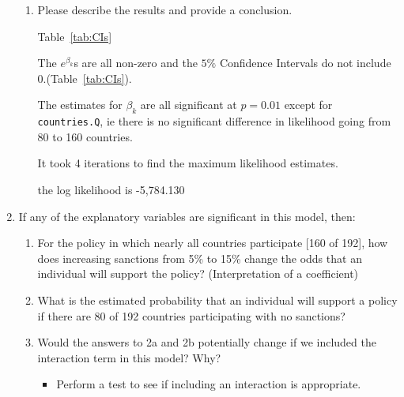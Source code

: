 \documentclass[12pt,letterpaper]{article}
\begin{document}
\begin{enumerate}
\begin{enumerate}
%	    
%	    
			

		\item  Please describe the results and provide a conclusion.

      Table~\ref{tab:CIs}
      
      The $e^{\beta_k}$s are all non-zero and the $5\%$ Confidence Intervals do not include 0.(Table~\ref{tab:CIs}).
      
      The estimates for $\beta_k$ are all significant at $p=0.01$ except for \texttt{countries.Q}, ie there is no significant difference in likelihood going from 80 to 160 countries.
      
	    

		It took 4 iterations to find the maximum likelihood estimates.
		
		the log likelihood is -5,784.130
	\end{enumerate}


	

	\item
	If any of the explanatory variables are significant in this model, then:
	\begin{enumerate}
		\item
		For the policy in which nearly all countries participate [160 of 192], how does increasing sanctions from 5\% to 15\% change the odds that an individual will support the policy? (Interpretation of a coefficient)
		\item
		What is the estimated probability that an individual will support a policy if there are 80 of 192 countries participating with no sanctions? 
		\item
		Would the answers to 2a and 2b potentially change if we included the interaction term in this model? Why? 
		\begin{itemize}
			\item Perform a test to see if including an interaction is appropriate.
			
			  
    	  

		\end{itemize}
	\end{enumerate}
	\end{enumerate}
\end{document}
